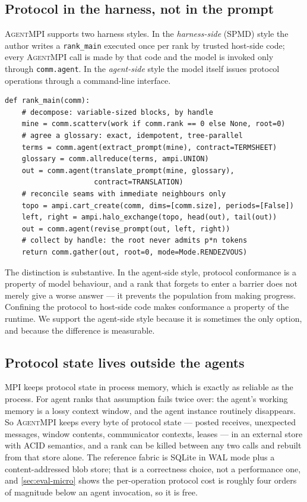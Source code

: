 \documentclass[10pt,twocolumn]{article}
\theoremstyle{definition}
\theoremstyle{plain}
\newcommand{\ampi}{\textsc{AgentMPI}}
\newcommand{\code}[1]{\texttt{\small #1}}
\begin{document}
\subsection{Protocol in the harness, not in the prompt}

\ampi{} supports two harness styles. In the \emph{harness-side} (SPMD) style the
author writes a \code{rank\_main} executed once per rank by trusted host-side code;
every \ampi{} call is made by that code and the model is invoked only through
\code{comm.agent}. In the \emph{agent-side} style the model itself issues protocol
operations through a command-line interface.

\begin{lstlisting}
def rank_main(comm):
    # decompose: variable-sized blocks, by handle
    mine = comm.scatterv(work if comm.rank == 0 else None, root=0)
    # agree a glossary: exact, idempotent, tree-parallel
    terms = comm.agent(extract_prompt(mine), contract=TERMSHEET)
    glossary = comm.allreduce(terms, ampi.UNION)
    out = comm.agent(translate_prompt(mine, glossary),
                     contract=TRANSLATION)
    # reconcile seams with immediate neighbours only
    topo = ampi.cart_create(comm, dims=[comm.size], periods=[False])
    left, right = ampi.halo_exchange(topo, head(out), tail(out))
    out = comm.agent(revise_prompt(out, left, right))
    # collect by handle: the root never admits p*n tokens
    return comm.gather(out, root=0, mode=Mode.RENDEZVOUS)
\end{lstlisting}

The distinction is substantive. In the agent-side style, protocol conformance is a
property of model behaviour, and a rank that forgets to enter a barrier does not
merely give a worse answer --- it prevents the population from making progress.
Confining the protocol to host-side code makes conformance a property of the
runtime. We support the agent-side style because it is sometimes the only option,
and because the difference is measurable.

\subsection{Protocol state lives outside the agents}

MPI keeps protocol state in process memory, which is exactly as reliable as the
process. For agent ranks that assumption fails twice over: the agent's working
memory is a lossy context window, and the agent instance routinely disappears. So
\ampi{} keeps every byte of protocol state --- posted receives, unexpected
messages, window contents, communicator contexts, leases --- in an external store
with ACID semantics, and a rank can be killed between any two calls and rebuilt
from that store alone. The reference fabric is SQLite in WAL mode plus a
content-addressed blob store; that is a correctness choice, not a performance one,
and \cref{sec:eval-micro} shows the per-operation protocol cost is roughly four
orders of magnitude below an agent invocation, so it is free.
\end{document}

